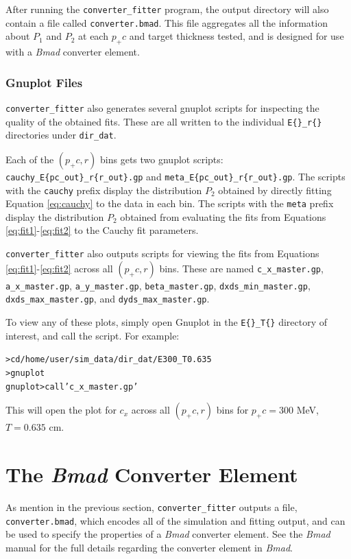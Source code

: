 \documentclass[12pt]{article}
\newcommand{\exef}{\texttt{converter\_fitter}\xspace}
\newcommand{\bmad}{\textit{Bmad}\xspace}
\newenvironment{example}
  {\vspace{-2.6ex} \begin{alltt}}
  {\end{alltt} \vspace{-2.3ex}}
\begin{document}
After running the \exef program, the output directory will also contain a file called
\texttt{converter.bmad}.  This file aggregates all the information about $P_1$ and $P_2$ at each
$p_+ c$ and target thickness tested, and is designed for use with a \bmad converter element.

\subsubsection{Gnuplot Files}

\exef  also generates several gnuplot scripts for inspecting the quality of the obtained fits.
These are all written to the individual \texttt{E\{\}\_r\{\}} directories under \texttt{dir\_dat}.

Each of the $(p_+ c, r)$ bins gets two gnuplot scripts:
\texttt{cauchy\_E\{pc\_out\}\_r\{r\_out\}.gp} and \texttt{meta\_E\{pc\_out\}\_r\{r\_out\}.gp}.  The
scripts with the \texttt{cauchy} prefix display the distribution $P_2$ obtained by directly fitting
Equation \ref{eq:cauchy} to the data in each bin.  The scripts with the \texttt{meta} prefix display
the distribution $P_2$ obtained from evaluating the fits from Equations \ref{eq:fit1}-\ref{eq:fit2}
to the Cauchy fit parameters.

\exef also outputs scripts for viewing the fits from Equations \ref{eq:fit1}-\ref{eq:fit2} across
all $(p_+ c, r)$ bins.  These are named \texttt{c\_x\_master.gp}, \texttt{a\_x\_master.gp},
\texttt{a\_y\_master.gp}, \texttt{beta\_master.gp}, \texttt{dxds\_min\_master.gp},
\texttt{dxds\_max\_master.gp}, and \texttt{dyds\_max\_master.gp}.

To view any of these plots, simply open Gnuplot in the \texttt{E\{\}\_T\{\}} directory of interest,
and call the script.  For example:
\begin{example}
  > cd /home/user/sim_data/dir_dat/E300_T0.635
  > gnuplot
  gnuplot> call 'c_x_master.gp'
\end{example}
This will open the plot for $c_x$ across all $(p_+ c, r)$ bins for $p_+ c = 300$ MeV, $T = 0.635$ cm.

\newpage
\section{The \bmad  Converter Element}

As mention in the previous section, \exef outputs a file, \texttt{converter.bmad}, which encodes all
of the simulation and fitting output, and can be used to specify the properties of a \bmad converter
element.  See the \bmad manual for the full details regarding the converter element in \bmad.
\end{document}
